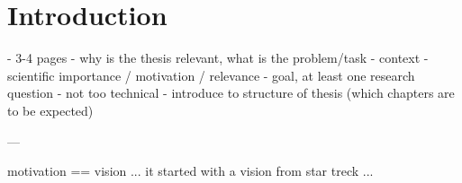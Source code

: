 

\chapter{Introduction}

- 3-4 pages
- why is the thesis relevant, what is the problem/task
  - context
  - scientific importance / motivation / relevance
  - goal, at least one research question
- not too technical
- introduce to structure of thesis (which chapters are to be expected)

---

motivation == vision
... it started with a vision from star treck ...
